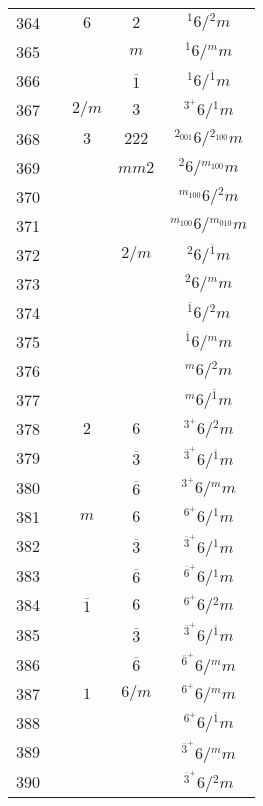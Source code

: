 \begin{longtable}{ccccc}
  364 &  & $6$ & $2$ & ${}^{1} 6  / {}^{2} m $\\
  365 &  &  & $m$ & ${}^{1} 6  / {}^{m} m $\\
  366 &  &  & $\overline{1}$ & ${}^{1} 6  / {}^{\overline{1}} m $\\
  367 &  & $2/m$ & $3$ & ${}^{3^{+}} 6  / {}^{1} m $\\
  368 &  & $3$ & $222$ & ${}^{2_{001}} 6  / {}^{2_{100}} m $\\
  369 &  &  & $mm2$ & ${}^{2} 6  / {}^{m_{100}} m $\\
  370 &  &  &  & ${}^{m_{100}} 6  / {}^{2} m $\\
  371 &  &  &  & ${}^{m_{100}} 6  / {}^{m_{010}} m $\\
  372 &  &  & $2/m$ & ${}^{2} 6  / {}^{\overline{1}} m $\\
  373 &  &  &  & ${}^{2} 6  / {}^{m} m $\\
  374 &  &  &  & ${}^{\overline{1}} 6  / {}^{2} m $\\
  375 &  &  &  & ${}^{\overline{1}} 6  / {}^{m} m $\\
  376 &  &  &  & ${}^{m} 6  / {}^{2} m $\\
  377 &  &  &  & ${}^{m} 6  / {}^{\overline{1}} m $\\
  378 &  & $2$ & $6$ & ${}^{3^{+}} 6  / {}^{2} m $\\
  379 &  &  & $\overline{3}$ & ${}^{\overline{3}^{+}} 6  / {}^{\overline{1}} m $\\
  380 &  &  & $\overline{6}$ & ${}^{3^{+}} 6  / {}^{m} m $\\
  381 &  & $m$ & $6$ & ${}^{6^{+}} 6  / {}^{1} m $\\
  382 &  &  & $\overline{3}$ & ${}^{\overline{3}^{+}} 6  / {}^{1} m $\\
  383 &  &  & $\overline{6}$ & ${}^{\overline{6}^{+}} 6  / {}^{1} m $\\
  384 &  & $\overline{1}$ & $6$ & ${}^{6^{+}} 6  / {}^{2} m $\\
  385 &  &  & $\overline{3}$ & ${}^{\overline{3}^{+}} 6  / {}^{\overline{1}} m $\\
  386 &  &  & $\overline{6}$ & ${}^{\overline{6}^{+}} 6  / {}^{m} m $\\
  387 &  & $1$ & $6/m$ & ${}^{6^{+}} 6  / {}^{m} m $\\
  388 &  &  &  & ${}^{6^{+}} 6  / {}^{\overline{1}} m $\\
  389 &  &  &  & ${}^{\overline{3}^{+}} 6  / {}^{m} m $\\
  390 &  &  &  & ${}^{\overline{3}^{+}} 6  / {}^{2} m $\\

\end{longtable}
